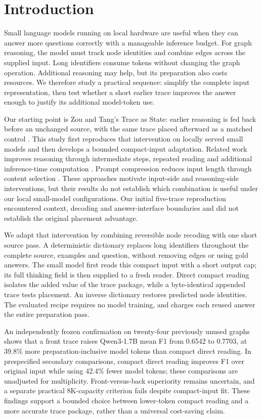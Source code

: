 \section{Introduction}
Small language models running on local hardware are useful when they can answer more questions correctly with a manageable inference budget. For graph reasoning, the model must track node identities and combine edges across the supplied input. Long identifiers consume tokens without changing the graph operation. Additional reasoning may help, but its preparation also costs resources. We therefore study a practical sequence: simplify the complete input representation, then test whether a short earlier trace improves the answer enough to justify its additional model-token use.

Our starting point is Zou and Tang's Trace as State: earlier reasoning is fed back before an unchanged source, with the same trace placed afterward as a matched control \citep{tang2026trace}. This study first reproduces that intervention on locally served small models and then develops a bounded compact-input adaptation. Related work improves reasoning through intermediate steps, repeated reading and additional inference-time computation \citep{wei2022cot,xu2024rereading,snell2025testtime}. Prompt compression reduces input length through content selection \citep{jiang2023llmlingua,pan2024llmlingua2}. These approaches motivate input-side and reasoning-side interventions, but their results do not establish which combination is useful under our local small-model configurations. Our initial five-trace reproduction encountered context, decoding and answer-interface boundaries and did not establish the original placement advantage.

We adapt that intervention by combining reversible node recoding with one short source pass. A deterministic dictionary replaces long identifiers throughout the complete source, examples and question, without removing edges or using gold answers. The small model first reads this compact input with a short output cap; its full thinking field is then supplied to a fresh reader. Direct compact reading isolates the added value of the trace package, while a byte-identical appended trace tests placement. An inverse dictionary restores predicted node identities. The evaluated recipe requires no model training, and charges each reused answer the entire preparation pass.

An independently frozen confirmation on twenty-four previously unused graphs shows that a front trace raises Qwen3-1.7B mean F1 from 0.6542 to 0.7703, at 39.8\% more preparation-inclusive model tokens than compact direct reading. In prespecified secondary comparisons, compact direct reading improves F1 over original input while using 42.4\% fewer model tokens; these comparisons are unadjusted for multiplicity. Front-versus-back superiority remains uncertain, and a separate practical 8K-capacity criterion fails despite compact-input fit. These findings support a bounded choice between lower-token compact reading and a more accurate trace package, rather than a universal cost-saving claim.


